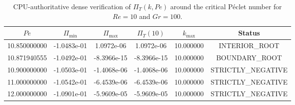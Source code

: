 \begin{table}[htbp]
\centering
\caption{CPU-authoritative dense verification of $\Pi_T(k,Pe)$ around the critical P\'eclet number for $Re=10$ and $Gr=100$.}
\label{tab:ultimate_global_summary}
\begin{ruledtabular}
\begin{tabular}{cccccc}
$Pe$ & $\Pi_{\min}$ & $\Pi_{\max}$ & $\Pi_T(10)$ & $k_{\max}$ & Status\\
\hline
10.850000000 & -1.0483e-01 & 1.0972e-06 & 1.0972e-06 & 10.000000 & INTERIOR_ROOT\\
10.871940555 & -1.0492e-01 & -8.3966e-15 & -8.3966e-15 & 10.000000 & BOUNDARY_ROOT\\
10.900000000 & -1.0503e-01 & -1.4068e-06 & -1.4068e-06 & 10.000000 & STRICTLY_NEGATIVE\\
11.000000000 & -1.0542e-01 & -6.4539e-06 & -6.4539e-06 & 10.000000 & STRICTLY_NEGATIVE\\
12.000000000 & -1.0901e-01 & -5.9609e-05 & -5.9609e-05 & 10.000000 & STRICTLY_NEGATIVE\\
\end{tabular}
\end{ruledtabular}
\end{table}
